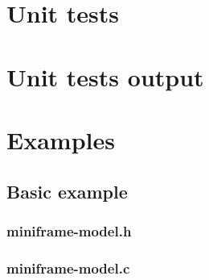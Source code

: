 \section{Unit tests}

\begin{scriptsize}
\begin{ttfamily}

\end{ttfamily}
\end{scriptsize}

\section{Unit tests output}

\begin{scriptsize}
\begin{ttfamily}

\end{ttfamily}
\end{scriptsize}

\section{Examples}

\subsection{Basic example}

\subsubsection{miniframe-model.h}

\begin{scriptsize}
\begin{ttfamily}

\end{ttfamily}
\end{scriptsize}

\subsubsection{miniframe-model.c}

\begin{scriptsize}
\begin{ttfamily}

\end{ttfamily}
\end{scriptsize}

